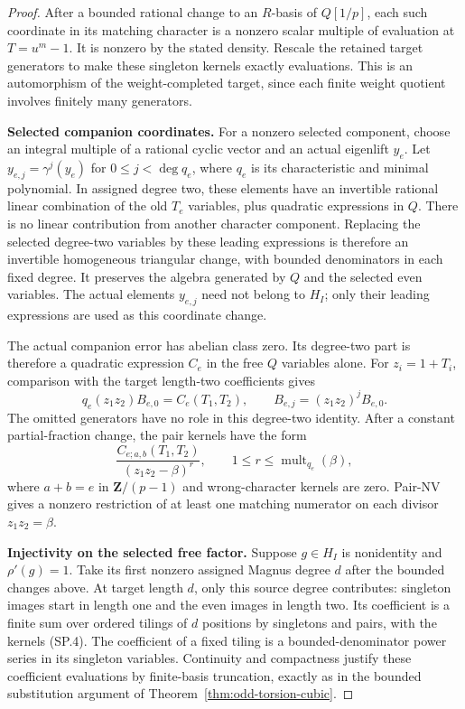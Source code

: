 \begin{proof}
After a bounded rational change to an $R$-basis of $Q[1/p]$,
each such coordinate in its matching character is a nonzero
scalar multiple of evaluation at $T=u^m-1$. It is nonzero by
the stated density. Rescale the retained target generators to
make these singleton kernels exactly evaluations. This is an
automorphism of the weight-completed target, since each finite
weight quotient involves finitely many generators.

\par\medskip\noindent\textbf{Selected companion coordinates.}
For a nonzero selected component, choose an integral multiple
of a rational cyclic vector and an actual eigenlift $y_e$.
Let $y_{e,j}=\gamma^j(y_e)$ for
$0\leq j<\deg q_e$, where $q_e$ is its characteristic and
minimal polynomial. In assigned degree two, these elements
have an invertible rational linear combination of the old
$T_e$ variables, plus quadratic expressions in $Q$.
There is no linear contribution from another character
component. Replacing the selected degree-two variables by
these leading expressions is therefore an invertible
homogeneous triangular change, with bounded denominators in
each fixed degree. It preserves the algebra generated by $Q$
and the selected even variables. The actual elements $y_{e,j}$
need not belong to $H_I$; only their leading expressions are
used as this coordinate change.

The actual companion error has abelian class zero. Its degree-two
part is therefore a quadratic expression $C_e$ in the free
$Q$ variables alone. For $z_i=1+T_i$, comparison with the
target length-two coefficients gives
\[
 q_e(z_1z_2)B_{e,0}=C_e(T_1,T_2),\qquad
 B_{e,j}=(z_1z_2)^jB_{e,0}.
\]
The omitted generators have no role in this degree-two
identity. After a constant partial-fraction change, the pair
kernels have the form
\[
              \frac{C_{e;a,b}(T_1,T_2)}{(z_1z_2-\beta)^r},
 \qquad 1\leq r\leq\operatorname{mult}_{q_e}(\beta),
 \tag{SP.4}
\]
where $a+b=e$ in $\mathbf Z/(p-1)$ and wrong-character kernels
are zero. Pair-NV gives a nonzero restriction of at least one
matching numerator on each divisor $z_1z_2=\beta$.

\par\medskip\noindent\textbf{Injectivity on the selected free factor.}
Suppose $g\in H_I$ is nonidentity and $\rho'(g)=1$.
Take its first nonzero assigned Magnus degree $d$ after the
bounded changes above. At target length $d$, only this source
degree contributes: singleton images start in length one and
the even images in length two. Its coefficient is a finite
sum over ordered tilings of $d$ positions by singletons and
pairs, with the kernels (SP.4). The coefficient of a fixed
tiling is a bounded-denominator power series in its singleton
variables. Continuity and compactness justify these coefficient
evaluations by finite-basis truncation, exactly as in the
bounded substitution argument of
Theorem~\ref{thm:odd-torsion-cubic}.


\end{proof}
